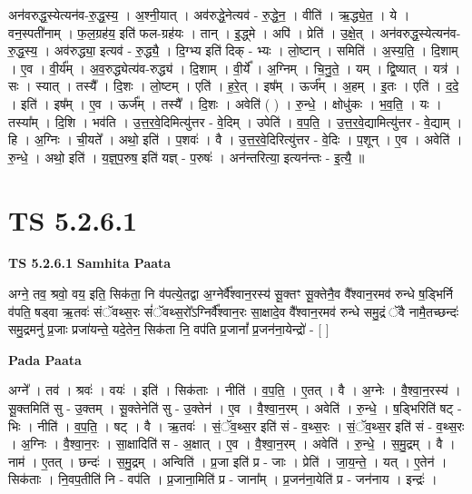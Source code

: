 \documentclass[17pt]{extarticle}
\begin{document}
अन॑वरुद्ध॒स्येत्यन॑व-रु॒द्ध॒स्य॒ । अ॒श्नी॒यात् । अव॑रुद्धे॒नेत्यव॑ - रु॒द्धे॒न॒ । वीति॑ । ऋ॒द्ध्ये॒त॒ । ये । वन॒स्पती॑नाम् । फ॒ल॒ग्रह॑य॒ इति॑ फल-ग्रह॑यः । तान् । इ॒द्ध्मे । अपि॑ । प्रेति॑ । उ॒क्षे॒त् । अन॑वरुद्ध॒स्येत्यन॑व-रु॒द्ध॒स्य॒ । अव॑रुद्ध्या॒ इत्यव॑ - रु॒द्ध्यै॒ । दि॒ग्भ्य इति॑ दिक् - भ्यः । लो॒ष्टान् । समिति॑ । अ॒स्य॒ति॒ । दि॒शाम् । ए॒व । वी॒र्य᳚म् । अ॒व॒रुद्ध्येत्य॑व-रुद्ध्य॑ । दि॒शाम् । वी॒र्ये᳚ । अ॒ग्निम् । चि॒नु॒ते॒ । यम् । द्वि॒ष्यात् । यत्र॑ । सः । स्यात् । तस्यै᳚ । दि॒शः । लो॒ष्टम् । एति॑ । ह॒रे॒त् । इष᳚म् । ऊर्ज᳚म् । अ॒हम् । इ॒तः । एति॑ । द॒दे॒ । इति॑ । इष᳚म् । ए॒व । ऊर्ज᳚म् । तस्यै᳚ । दि॒शः । अवेति॑ ( ) । रु॒न्धे॒ । क्षोधु॑कः । भ॒व॒ति॒ । यः । तस्या᳚म् । दि॒शि । भव॑ति । उ॒त्त॒र॒वे॒दिमित्यु॑त्तर - वे॒दिम् । उपेति॑ । व॒प॒ति॒ । उ॒त्त॒र॒वे॒द्यामित्यु॑त्तर - वे॒द्याम् । हि । अ॒ग्निः । ची॒यते᳚ । अथो॒ इति॑ । प॒शवः॑ । वै । उ॒त्त॒र॒वे॒दिरित्यु॑त्तर - वे॒दिः । प॒शून् । ए॒व । अवेति॑ । रु॒न्धे॒ । अथो॒ इति॑ । य॒ज्ञ्॒प॒रुष॒ इति॑ यज्ञ् - प॒रुषः॑ । अन॑न्तरित्या॒ इत्यन॑न्तः - इ॒त्यै॒ ॥  \newline





\section{ TS 5.2.6.1 }

\textbf{TS 5.2.6.1 } \newline
\textbf{Samhita Paata} \newline

अग्ने॒ तव॒ श्रवो॒ वय॒ इति॒ सिक॑ता॒ नि व॑पत्ये॒तद्वा अ॒ग्नेर्वै᳚श्वान॒रस्य॑ सू॒क्तꣳ सू॒क्तेनै॒व वै᳚श्वान॒रमव॑ रुन्धे ष॒ड्भिर्नि व॑पति॒ षड्वा ऋ॒तवः॑ संॅवथ्स॒रः सं॑ॅवथ्स॒रो᳚ऽग्निर्वै᳚श्वान॒रः सा॒क्षादे॒व वै᳚श्वान॒रमव॑ रुन्धे समु॒द्रं ॅवै नामै॒तच्छन्दः॑ समु॒द्रमनु॑ प्र॒जाः प्रजा॑यन्ते॒ यदे॒तेन॒ सिक॑ता नि॒ वप॑ति प्र॒जानां᳚ प्र॒जन॑ना॒येन्द्रो॑ - [  ] \newline

\textbf{Pada Paata} \newline

अग्ने᳚ । तव॑ । श्रवः॑ । वयः॑ । इति॑ । सिक॑ताः । नीति॑ । व॒प॒ति॒ । ए॒तत् । वै । अ॒ग्नेः । वै॒श्वा॒न॒रस्य॑ । सू॒क्तमिति॑ सु - उ॒क्तम् । सू॒क्तेनेति॑ सु - उ॒क्तेन॑ । ए॒व । वै॒श्वा॒न॒रम् । अवेति॑ । रु॒न्धे॒ । ष॒ड्भिरिति॑ षट् - भिः । नीति॑ । व॒प॒ति॒ । षट् । वै । ऋ॒तवः॑ । सं॒ॅव॒थ्स॒र इति॑ सं - व॒थ्स॒रः । सं॒ॅव॒थ्स॒र इति॑ सं - व॒थ्स॒रः । अ॒ग्निः । वै॒श्वा॒न॒रः । सा॒क्षादिति॑ स - अ॒क्षात् । ए॒व । वै॒श्वा॒न॒रम् । अवेति॑ । रु॒न्धे॒ । स॒मु॒द्रम् । वै । नाम॑ । ए॒तत् । छन्दः॑ । स॒मु॒द्रम् । अन्विति॑ । प्र॒जा इति॑ प्र - जाः । प्रेति॑ । जा॒य॒न्ते॒ । यत् । ए॒तेन॑ । सिक॑ताः । नि॒वप॒तीति॑ नि - वप॑ति । प्र॒जाना॒मिति॑ प्र - जाना᳚म् । प्र॒जन॑ना॒येति॑ प्र - जन॑नाय । इन्द्रः॑ ।  \newline
\end{document}
